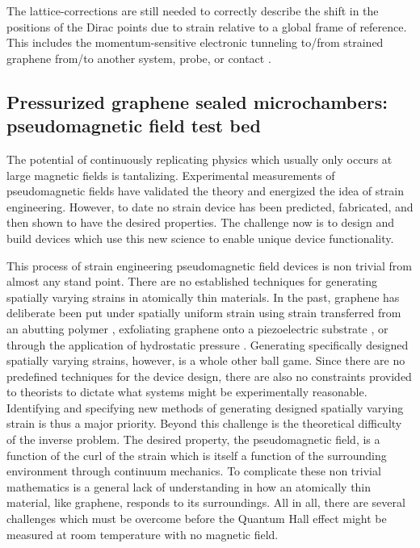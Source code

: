 The lattice-corrections are still needed to correctly describe the shift in the positions of the Dirac points due to strain relative to a global frame of reference.
This includes the momentum-sensitive electronic tunneling to/from strained graphene from/to another system, probe, or contact \cite{Fogler2008}.

\subsection{Pressurized graphene sealed microchambers: pseudomagnetic field test bed}
The potential of continuously replicating physics which usually only occurs at large magnetic fields is tantalizing.
Experimental measurements of pseudomagnetic fields \cite{Levy2010,Yan2012,Yeh2011,Gomes2012} have validated the theory and energized the idea of strain engineering.
However, to date no strain device has been predicted, fabricated, and then shown to have the desired properties.
The challenge now is to design and build devices which use this new science to enable unique device functionality.

This process of strain engineering pseudomagnetic field devices is non trivial from almost any stand point.
There are no established techniques for generating spatially varying strains in atomically thin materials.
In the past, graphene has deliberate been put under spatially uniform strain using strain transferred from an abutting polymer \cite{Yu2008,Ni2008,Tsoukleri2009,Huang2009,Mohiuddin2009,Frank2010,Yoon2011}, exfoliating graphene onto a piezoelectric substrate \cite{Ding2010,Jie2013}, or through the application of hydrostatic pressure \cite{Proctor2009,Clark2012}.
Generating specifically designed spatially varying strains, however, is a whole other ball game.
Since there are no predefined techniques for the device design, there are also no constraints provided to theorists to dictate what systems might be experimentally reasonable.
Identifying and specifying new methods of generating designed spatially varying strain is thus a major priority.
Beyond this challenge is the theoretical difficulty of the inverse problem.
The desired property, the pseudomagnetic field, is a function of the curl of the strain which is itself a function of the surrounding environment through continuum mechanics.
To complicate these non trivial mathematics is a general lack of understanding in how an atomically thin material, like graphene, responds to its surroundings.
All in all, there are several challenges which must be overcome before the Quantum Hall effect might be measured at room temperature with no magnetic field.

